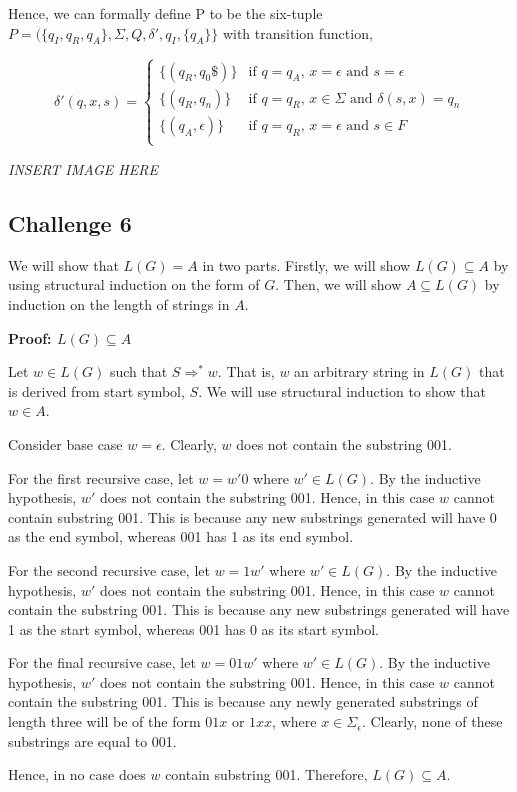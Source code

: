\documentclass[12pt]{article}
\newcommand{\impl}{\mathbin{\Rightarrow}}
\begin{document}
\bigskip
\noindent
Hence, we can formally define P to be the six-tuple $P=(\{q_I, q_R, q_A\}, \Sigma, Q, \delta', q_I, \{q_A\}\}$
with transition function,

\[
  \delta'(q, x, s) =
  \begin{cases}
  	\{(q_R, q_0\$)\}   & \text{if $q=q_A$, $x=\epsilon$ and $s=\epsilon$} \\
      \{(q_R, q_n)\}        & \text{if $q=q_R$, $x \in \Sigma$ and $\delta (s, x)=q_n$} \\
      \{(q_A, \epsilon)\} & \text{if $q=q_R$, $x=\epsilon$ and $s \in F$} \\
  \end{cases}
\]

\emph{INSERT IMAGE HERE}


\subsection*{Challenge 6}
We will show that $L(G) = A$ in two parts. Firstly, we will show $L(G) \subseteq A$ by using structural induction
on the form of $G$. Then, we will show $A \subseteq L(G)$ by induction on the length of strings in $A$.

\bigskip
\noindent
\textbf{Proof: $L(G) \subseteq A$}

\bigskip
\noindent
Let $w \in L(G)$ such that $S \impl^* w$. That is, $w$ an arbitrary string in $L(G)$ that is derived from 
start symbol, $S$. We will use structural induction to show that $w \in A$.

\bigskip
\noindent
Consider base case $w = \epsilon$. Clearly, $w$ does not contain the substring 001.

\bigskip
\noindent
For the first recursive case, let $w=w'0$ where $w' \in L(G)$. By the inductive hypothesis, $w'$ does not contain
the substring 001. Hence, in this case $w$ cannot contain substring 001. This is because any new substrings generated 
will have 0 as the end symbol, whereas 001 has 1 as its end symbol.

\bigskip
\noindent
For the second recursive case, let $w=1w'$ where $w' \in L(G)$. By the inductive hypothesis, $w'$ does not contain
the substring 001. Hence, in this case $w$ cannot contain the substring 001. This is because any new substrings generated 
will have 1 as the start symbol, whereas 001 has 0 as its start symbol.

\bigskip
\noindent
For the final recursive case, let $w=01w'$ where $w' \in L(G)$. By the inductive hypothesis, $w'$ does not contain the
substring 001. Hence, in this case $w$ cannot contain the substring 001. This is because any newly generated substrings
of length three will be of the form $01x$ or $1xx$, where $x \in \Sigma_\epsilon$. Clearly, none of these substrings are equal to 001.

\bigskip
\noindent
Hence, in no case does $w$ contain substring 001. Therefore, $L(G) \subseteq A$.
\end{document}
